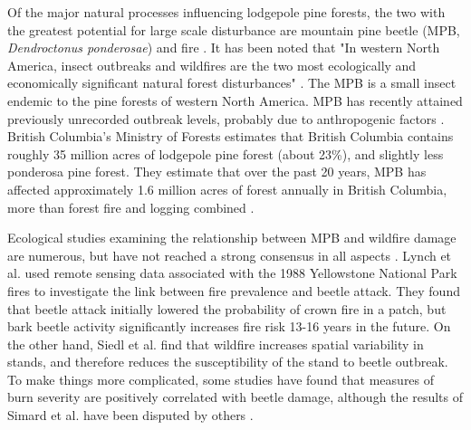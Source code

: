 Of the major natural processes influencing lodgepole pine forests, the two with the greatest potential for large scale disturbance are mountain pine beetle (MPB, \textit{Dendroctonus ponderosae}) and fire \cite{kaufmann2008status}. It has been noted that "In western North America, insect outbreaks and wildfires are the two most ecologically and economically significant natural forest disturbances" \cite{meigs2016insect}. The MPB is a small insect endemic to the pine forests of western North America. MPB has recently attained previously unrecorded outbreak levels, probably due to anthropogenic factors \cite{bentz2010climate,safranyik2007mountain}.  British Columbia's Ministry of Forests estimates that British Columbia contains roughly 35 million acres of lodgepole pine forest (about 23\%), and slightly less ponderosa pine forest. They estimate that over the past 20 years, MPB has affected approximately 1.6 million acres of forest annually in British Columbia, more than forest fire and logging combined \cite{bc2010state}.

Ecological studies examining the relationship between MPB and wildfire damage are numerous, but have not reached a strong consensus in all aspects \cite{axelson2009influence,lynch2006influence, simard2011mountain, bradley2001effects,kaufmann2008status,meigs2016insect,agne2016fire,seidl2016spatial,JENKINS200816}. Lynch et al. \cite{lynch2006influence} used remote sensing data associated with the 1988 Yellowstone National Park fires to investigate the link between fire prevalence and beetle attack. They found that beetle attack initially lowered the probability of crown fire in a patch, but bark beetle activity significantly increases fire risk 13-16 years in the future. On the other hand, Siedl et al. \cite{seidl2016spatial} find that wildfire increases spatial variability in stands, and therefore reduces the susceptibility of the stand to beetle outbreak. To make things more complicated, some studies have found that measures of burn severity are positively correlated with beetle damage\cite{simard2011mountain, bradley2001effects}, although the results of Simard et al. \cite{simard2011mountain} have been disputed by others \cite{moran2012mountain}.

